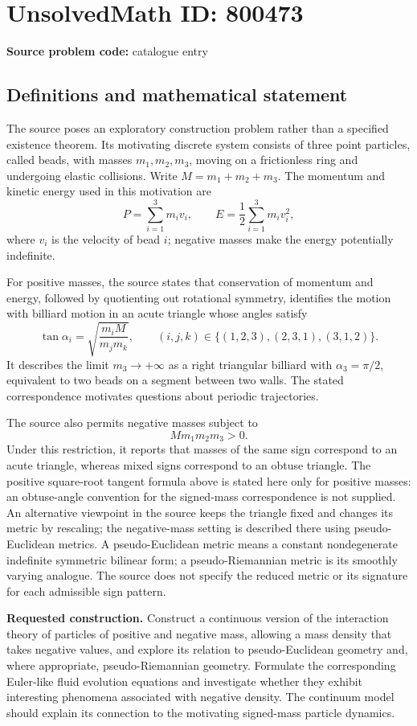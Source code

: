 \documentclass[11pt]{article}
\begin{document}
\section*{UnsolvedMath ID: 800473}
\textbf{Source problem code:} catalogue entry
\subsection{Definitions and mathematical statement}
The source poses an exploratory construction problem rather than a specified existence theorem. Its motivating discrete system consists of three point particles, called beads, with masses \(m_1,m_2,m_3\), moving on a frictionless ring and undergoing elastic collisions. Write \(M=m_1+m_2+m_3\). The momentum and kinetic energy used in this motivation are
\[
P=\sum_{i=1}^{3}m_i v_i,\qquad E=\frac12\sum_{i=1}^{3}m_i v_i^2,
\]
where \(v_i\) is the velocity of bead \(i\); negative masses make the energy potentially indefinite.

For positive masses, the source states that conservation of momentum and energy, followed by quotienting out rotational symmetry, identifies the motion with billiard motion in an acute triangle whose angles satisfy
\[
\tan\alpha_i=\sqrt{\frac{m_iM}{m_jm_k}},\qquad (i,j,k)\in\{(1,2,3),(2,3,1),(3,1,2)\}.
\]
It describes the limit \(m_3\to+\infty\) as a right triangular billiard with \(\alpha_3=\pi/2\), equivalent to two beads on a segment between two walls. The stated correspondence motivates questions about periodic trajectories.

The source also permits negative masses subject to
\[
Mm_1m_2m_3>0.
\]
Under this restriction, it reports that masses of the same sign correspond to an acute triangle, whereas mixed signs correspond to an obtuse triangle. The positive square-root tangent formula above is stated here only for positive masses: an obtuse-angle convention for the signed-mass correspondence is not supplied. An alternative viewpoint in the source keeps the triangle fixed and changes its metric by rescaling; the negative-mass setting is described there using pseudo-Euclidean metrics. A pseudo-Euclidean metric means a constant nondegenerate indefinite symmetric bilinear form; a pseudo-Riemannian metric is its smoothly varying analogue. The source does not specify the reduced metric or its signature for each admissible sign pattern.

\textbf{Requested construction.} Construct a continuous version of the interaction theory of particles of positive and negative mass, allowing a mass density that takes negative values, and explore its relation to pseudo-Euclidean geometry and, where appropriate, pseudo-Riemannian geometry. Formulate the corresponding Euler-like fluid evolution equations and investigate whether they exhibit interesting phenomena associated with negative density. The continuum model should explain its connection to the motivating signed-mass particle dynamics.
\end{document}
